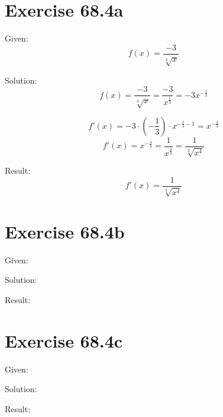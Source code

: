 \documentclass[a4paper, 10pt]{scrartcl}
\begin{document}
\section{Exercise 68.4a}

Given:
\[f(x) = \frac{-3}{\sqrt[3]{x}}\]

Solution:
\[f(x) = \frac{-3}{\sqrt[3]{x}} = \frac{-3}{x^{\frac{1}{3}}} = -3x^{-\frac{1}{3}}\]

\[f'(x) = -3\cdot(-\frac{1}{3})\cdot x^{-\frac{1}{3} - 1} = x^{-\frac{4}{3}}\]
\[f'(x) = x^{-\frac{4}{3}} = \frac{1}{x^{\frac{4}{3}}} = \frac{1}{\sqrt[3]{x^{4}}}\]

Result:
\[f'(x) = \frac{1}{\sqrt[3]{x^{4}}}\]

\section{Exercise 68.4b}

Given:

Solution:

Result:

\section{Exercise 68.4c}

Given:

Solution:

Result:
\end{document}
